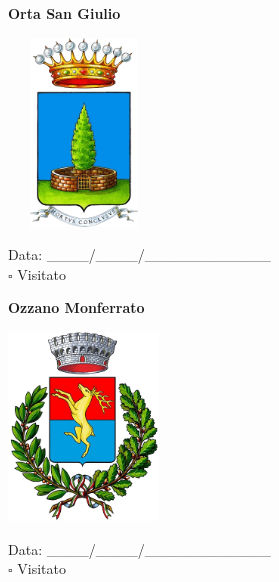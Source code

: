 \documentclass[a5paper,12pt]{article}
\begin{document}
\newpage

\noindent
\begin{minipage}[t]{0.45\textwidth}
    \begin{center}
        \textbf{Orta San Giulio}
    \end{center}
    \vspace{-0.5cm} %
    \begin{center}
        \includegraphics[height= 5cm, width=4cm]{Piemonte/Stemma Orta San Giulio.png}
    \end{center}
    \vspace{-0.4cm} %
    \begin{flushleft}
        Data: \_\_\_\_/\_\_\_\_/\_\_\_\_\_\_\_\_\_\_\_\_ \\
        $\square$ Visitato
    \end{flushleft}
\end{minipage}
\hfill
\noindent
\begin{minipage}[t]{0.45\textwidth}
    \begin{center}
        \textbf{Ozzano Monferrato}
    \end{center}
    \vspace{-0.5cm} %
    \begin{center}
        \includegraphics[height= 5cm, width=4cm]{Piemonte/Stemma Ozzano Monferrato.png}
    \end{center}
    \vspace{-0.4cm} %
    \begin{flushleft}
        Data: \_\_\_\_/\_\_\_\_/\_\_\_\_\_\_\_\_\_\_\_\_ \\
        $\square$ Visitato
    \end{flushleft}
\end{minipage}
\end{document}
